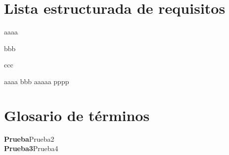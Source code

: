 \documentclass[11pt,a4paper]{article}
\newcommand{\term}[2]{\textbf{#1}\quad#2\\}
\newcommand{\rf}[1]{#1}
\newcommand{\rn}[1]{#1}
\newcommand{\ri}[1]{#1}
\begin{document}



\section{Lista estructurada de requisitos} %
\label{sec:lista_estructurada_de_requisitos}

\rf{aaaa}

\rn{bbb}

\ri{ccc}

aaaa
bbb
aaaaa
pppp


\section{Glosario de términos} %
\label{sec:glosario_de_términos}

\term{Prueba}{Prueba2}
\term{Prueba3}{Prueba4}



	
\end{document}
